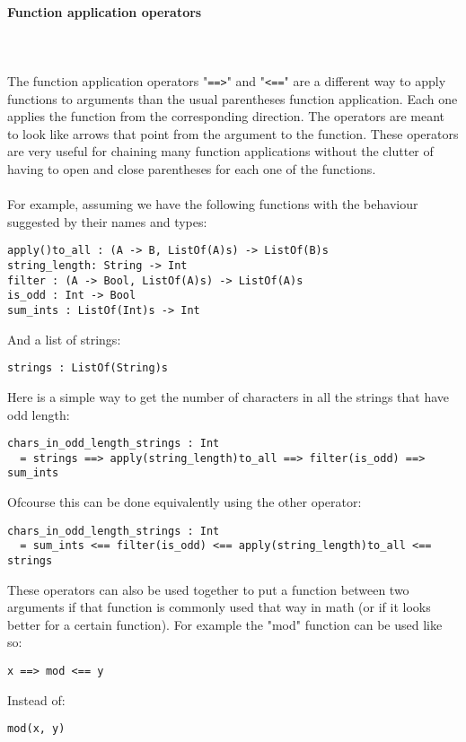 \documentclass{article}
\def\pend{\mbox{} \\\\}
\begin{document}
\paragraph{Function application operators}\pend
The function application operators "\texttt{==>}" and "\texttt{<==}" are a different
way to apply functions to arguments than the usual parentheses function application.
Each one applies the function from the corresponding direction. The operators are 
meant to look like arrows that point from the argument to the function.
These operators are very useful for chaining many function applications without the
clutter of having to open and close parentheses for each one of the functions.\\\\
For example, assuming we have the following functions with the behaviour suggested
by their names and types:
\begin{verbatim}
apply()to_all : (A -> B, ListOf(A)s) -> ListOf(B)s
string_length: String -> Int
filter : (A -> Bool, ListOf(A)s) -> ListOf(A)s
is_odd : Int -> Bool
sum_ints : ListOf(Int)s -> Int
\end{verbatim}
And a list of strings:
\begin{verbatim}
strings : ListOf(String)s
\end{verbatim}
Here is a simple way to get the number of characters in all the strings that have 
odd length:
\begin{verbatim}
chars_in_odd_length_strings : Int
  = strings ==> apply(string_length)to_all ==> filter(is_odd) ==> sum_ints
\end{verbatim}
Ofcourse this can be done equivalently using the other operator:
\begin{verbatim}
chars_in_odd_length_strings : Int
  = sum_ints <== filter(is_odd) <== apply(string_length)to_all <== strings
\end{verbatim}
These operators can also be used together to put a function between two arguments
if that function is commonly used that way in math (or if it looks better for a
certain function). For example the "mod" function can be used like so:
\begin{verbatim}
x ==> mod <== y
\end{verbatim}
Instead of:
\begin{verbatim}
mod(x, y)
\end{verbatim}
\end{document}
